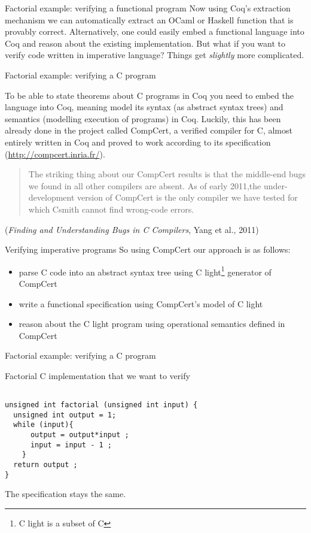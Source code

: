 \documentclass[10pt]{beamer}
\begin{document}
\begin{frame}{Factorial example: verifying a functional program}
Now using Coq's extraction mechanism we can automatically extract an OCaml or Haskell function that is provably correct. Alternatively, one could easily embed a functional language into Coq and reason about the existing implementation. But what if you want to verify code written in imperative language? Things get \emph{slightly} more complicated.
  \end{frame}


  \begin{frame}{Factorial example: verifying a C program}

    To be able to state theorems about C programs in Coq you need to embed the language into Coq, meaning model its syntax (as abstract syntax trees) and semantics (modelling execution of programs) in Coq. Luckily, this has been already done in the project called CompCert, a verified compiler for C, almost entirely written in Coq and proved to work according to its specification (\url{http://compcert.inria.fr/}).

    \begin{quote}
      The striking thing about our CompCert results is that the middle-end bugs we found in all other compilers are absent. As of early 2011,the under-development version of CompCert is the only compiler we have tested for which Csmith cannot find wrong-code errors.
    \end{quote} ({\it Finding and Understanding Bugs in C Compilers}, Yang et al., 2011)

  \end{frame}
    
  \begin{frame}{Verifying imperative programs}
    So using CompCert our approach is as follows:
  \begin{itemize}
  \item parse C code into an abstract syntax tree using C light\footnote{C light is a subset of C} generator of CompCert
  \item write a functional specification using CompCert's model of C light 
  \item reason about the C light program using operational semantics defined in CompCert
\end{itemize}
\end{frame}


\begin{frame}[fragile]{Factorial example: verifying a C program}

 Factorial C implementation that we want to verify

\begin{lstlisting}

unsigned int factorial (unsigned int input) {
  unsigned int output = 1;
  while (input){
      output = output*input ;
      input = input - 1 ;
    } 
  return output ;
}

\end{lstlisting}

The specification stays the same. 

\end{frame}
\end{document}
